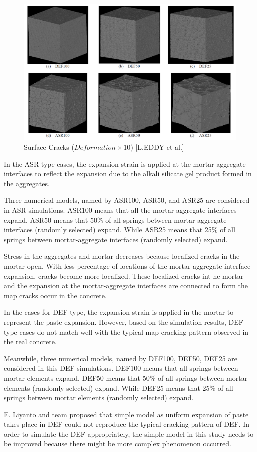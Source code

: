 \begin{itemize}
    \begin{figure}[ht!]
        \centering
        \includegraphics[width=.9\linewidth]{Files/Background/EDDY.png}
        \caption{Surface Cracks ($Deformation \times 10$) [L.EDDY et al.\cite{Eddy}]}
        \label{fig:asdDDY}
    \end{figure}

    In the ASR-type cases, the expansion strain is applied at the mortar-aggregate interfaces to reflect the expansion due to the alkali silicate gel product formed in the aggregates.

    Three numerical models, named by ASR100, ASR50, and ASR25 are considered in ASR simulations. ASR100 means that all the mortar-aggregate interfaces expand. ASR50 means that 50\% of all springs between mortar-aggregate interfaces (randomly selected) expand. While ASR25 means that 25\% of all springs between mortar-aggregate interfaces (randomly selected) expand.

    Stress in the aggregates and mortar decreases because localized cracks in the mortar open. With less percentage of locations of the mortar-aggregate interface expansion, cracks become more localized. These localized cracks int he mortar and the expansion at the mortar-aggregate interfaces are connected to form the map cracks occur in the concrete.

    In the cases for DEF-type, the expansion strain is applied in the mortar to represent the paste expansion. However, based on the simulation results, DEF-type cases do not match well with the typical map cracking pattern observed in the real concrete.

    Meanwhile, three numerical models, named by DEF100, DEF50, DEF25 are considered in this DEF simulations. DEF100 means that all springs between mortar elements expand. DEF50 means that 50\% of all springs between mortar elements (randomly selected) expand. While DEF25 means that 25\% of all springs between mortar elements (randomly selected) expand.

    E. Liyanto and team proposed that simple model as uniform expansion of paste takes place in DEF could not reproduce the typical cracking pattern of DEF. In order to simulate the DEF appropriately, the simple model in this study needs to be improved because there might be more complex phenomenon occurred.

\end{itemize}

